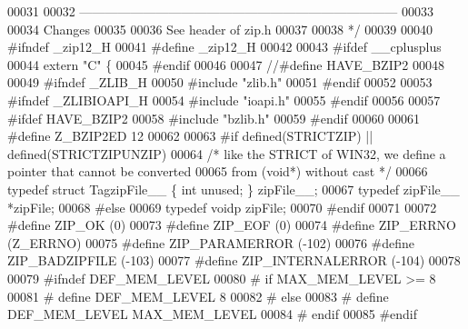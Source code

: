 \begin{DoxyCode}
00031 \textcolor{comment}{}
00032 \textcolor{comment}{        ---------------------------------------------------------------------------}
00033 \textcolor{comment}{}
00034 \textcolor{comment}{        Changes}
00035 \textcolor{comment}{}
00036 \textcolor{comment}{        See header of zip.h}
00037 \textcolor{comment}{}
00038 \textcolor{comment}{*/}
00039 
00040 \textcolor{preprocessor}{#ifndef \_zip12\_H}
00041 \textcolor{preprocessor}{#define \_zip12\_H}
00042 
00043 \textcolor{preprocessor}{#ifdef \_\_cplusplus}
00044 \textcolor{keyword}{extern} \textcolor{stringliteral}{"C"} \{
00045 \textcolor{preprocessor}{#endif}
00046 
00047 \textcolor{comment}{//#define HAVE\_BZIP2}
00048 
00049 \textcolor{preprocessor}{#ifndef \_ZLIB\_H}
00050 \textcolor{preprocessor}{#include "zlib.h"}
00051 \textcolor{preprocessor}{#endif}
00052 
00053 \textcolor{preprocessor}{#ifndef \_ZLIBIOAPI\_H}
00054 \textcolor{preprocessor}{#include "ioapi.h"}
00055 \textcolor{preprocessor}{#endif}
00056 
00057 \textcolor{preprocessor}{#ifdef HAVE\_BZIP2}
00058 \textcolor{preprocessor}{#include "bzlib.h"}
00059 \textcolor{preprocessor}{#endif}
00060 
00061 \textcolor{preprocessor}{#define Z\_BZIP2ED 12}
00062 
00063 \textcolor{preprocessor}{#if defined(STRICTZIP) || defined(STRICTZIPUNZIP)}
00064 \textcolor{comment}{/* like the STRICT of WIN32, we define a pointer that cannot be converted}
00065 \textcolor{comment}{    from (void*) without cast */}
00066 \textcolor{keyword}{typedef} \textcolor{keyword}{struct }TagzipFile\_\_ \{ \textcolor{keywordtype}{int} unused; \} zipFile\_\_;
00067 \textcolor{keyword}{typedef} zipFile\_\_ *zipFile;
00068 \textcolor{preprocessor}{#else}
00069 \textcolor{keyword}{typedef} voidp zipFile;
00070 \textcolor{preprocessor}{#endif}
00071 
00072 \textcolor{preprocessor}{#define ZIP\_OK                          (0)}
00073 \textcolor{preprocessor}{#define ZIP\_EOF                         (0)}
00074 \textcolor{preprocessor}{#define ZIP\_ERRNO                       (Z\_ERRNO)}
00075 \textcolor{preprocessor}{#define ZIP\_PARAMERROR                  (-102)}
00076 \textcolor{preprocessor}{#define ZIP\_BADZIPFILE                  (-103)}
00077 \textcolor{preprocessor}{#define ZIP\_INTERNALERROR               (-104)}
00078 
00079 \textcolor{preprocessor}{#ifndef DEF\_MEM\_LEVEL}
00080 \textcolor{preprocessor}{#  if MAX\_MEM\_LEVEL >= 8}
00081 \textcolor{preprocessor}{#    define DEF\_MEM\_LEVEL 8}
00082 \textcolor{preprocessor}{#  else}
00083 \textcolor{preprocessor}{#    define DEF\_MEM\_LEVEL  MAX\_MEM\_LEVEL}
00084 \textcolor{preprocessor}{#  endif}
00085 \textcolor{preprocessor}{#endif}

\end{DoxyCode}
